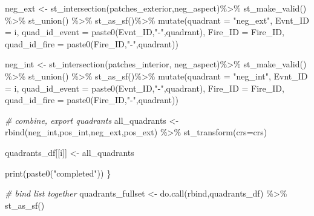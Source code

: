 \documentclass[
]{book}
\newenvironment{Shaded}{\begin{snugshade}}{\end{snugshade}}
\newcommand{\AttributeTok}[1]{\textcolor[rgb]{0.77,0.63,0.00}{#1}}
\newcommand{\CommentTok}[1]{\textcolor[rgb]{0.56,0.35,0.01}{\textit{#1}}}
\newcommand{\FunctionTok}[1]{\textcolor[rgb]{0.00,0.00,0.00}{#1}}
\newcommand{\NormalTok}[1]{#1}
\newcommand{\OtherTok}[1]{\textcolor[rgb]{0.56,0.35,0.01}{#1}}
\newcommand{\SpecialCharTok}[1]{\textcolor[rgb]{0.00,0.00,0.00}{#1}}
\newcommand{\StringTok}[1]{\textcolor[rgb]{0.31,0.60,0.02}{#1}}
\begin{document}
\begin{Shaded}
\begin{Highlighting}[]
\NormalTok{  neg\_ext }\OtherTok{\textless{}{-}} \FunctionTok{st\_intersection}\NormalTok{(patches\_exterior,neg\_aspect)}\SpecialCharTok{\%\textgreater{}\%} 
    \FunctionTok{st\_make\_valid}\NormalTok{() }\SpecialCharTok{\%\textgreater{}\%}
    \FunctionTok{st\_union}\NormalTok{() }\SpecialCharTok{\%\textgreater{}\%} 
    \FunctionTok{st\_as\_sf}\NormalTok{()}\SpecialCharTok{\%\textgreater{}\%} 
    \FunctionTok{mutate}\NormalTok{(}\AttributeTok{quadrant =} \StringTok{"neg\_ext"}\NormalTok{,}
           \AttributeTok{Evnt\_ID =}\NormalTok{ i,}
           \AttributeTok{quad\_id\_event =} \FunctionTok{paste0}\NormalTok{(Evnt\_ID,}\StringTok{"{-}"}\NormalTok{,quadrant),}
           \AttributeTok{Fire\_ID =}\NormalTok{ Fire\_ID,}
           \AttributeTok{quad\_id\_fire =} \FunctionTok{paste0}\NormalTok{(Fire\_ID,}\StringTok{"{-}"}\NormalTok{,quadrant))}
  
\NormalTok{  neg\_int }\OtherTok{\textless{}{-}} \FunctionTok{st\_intersection}\NormalTok{(patches\_interior, neg\_aspect)}\SpecialCharTok{\%\textgreater{}\%} 
    \FunctionTok{st\_make\_valid}\NormalTok{() }\SpecialCharTok{\%\textgreater{}\%}
    \FunctionTok{st\_union}\NormalTok{() }\SpecialCharTok{\%\textgreater{}\%} 
    \FunctionTok{st\_as\_sf}\NormalTok{()}\SpecialCharTok{\%\textgreater{}\%} 
    \FunctionTok{mutate}\NormalTok{(}\AttributeTok{quadrant =} \StringTok{"neg\_int"}\NormalTok{,}
           \AttributeTok{Evnt\_ID =}\NormalTok{ i,}
           \AttributeTok{quad\_id\_event =} \FunctionTok{paste0}\NormalTok{(Evnt\_ID,}\StringTok{"{-}"}\NormalTok{,quadrant),}
           \AttributeTok{Fire\_ID =}\NormalTok{ Fire\_ID,}
           \AttributeTok{quad\_id\_fire =} \FunctionTok{paste0}\NormalTok{(Fire\_ID,}\StringTok{"{-}"}\NormalTok{,quadrant))}
  
  \CommentTok{\# combine, export quadrants}
\NormalTok{  all\_quadrants }\OtherTok{\textless{}{-}} \FunctionTok{rbind}\NormalTok{(neg\_int,pos\_int,neg\_ext,pos\_ext) }\SpecialCharTok{\%\textgreater{}\%} 
    \FunctionTok{st\_transform}\NormalTok{(}\AttributeTok{crs=}\NormalTok{crs)}

\NormalTok{  quadrants\_df[[i]] }\OtherTok{\textless{}{-}}\NormalTok{ all\_quadrants}
  
  \FunctionTok{print}\NormalTok{(}\FunctionTok{paste0}\NormalTok{(}\StringTok{"completed"}\NormalTok{))}
\NormalTok{\}}

\CommentTok{\# bind list together}
\NormalTok{quadrants\_fullset }\OtherTok{\textless{}{-}} \FunctionTok{do.call}\NormalTok{(rbind,quadrants\_df) }\SpecialCharTok{\%\textgreater{}\%} 
  \FunctionTok{st\_as\_sf}\NormalTok{() }
\end{Highlighting}
\end{Shaded}
\end{document}
